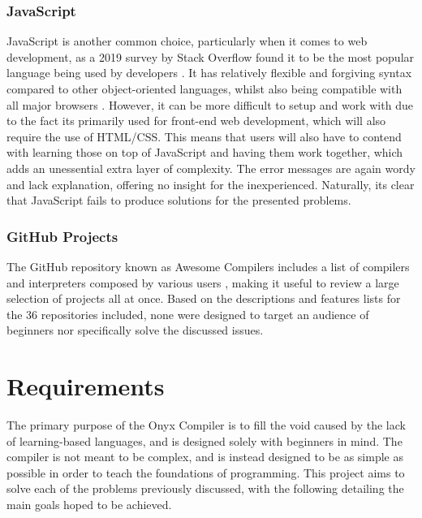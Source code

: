 \documentclass[
]{report}
\begin{document}
\subsection{JavaScript}
JavaScript is another common choice, particularly when it comes to web
development, as a 2019 survey by Stack Overflow found it to be the most
popular language being used by developers \cite{survey-stackoverflow}. It has relatively
flexible and forgiving syntax compared to other object-oriented
languages, whilst also being compatible with all major browsers
\cite{fullstack-article}. However, it can be more difficult to setup and work with due
to the fact its primarily used for front-end web development, which will
also require the use of HTML/CSS. This means that users will also have
to contend with learning those on top of JavaScript and having them work
together, which adds an unessential extra layer of complexity. The error
messages are again wordy and lack explanation, offering no insight for
the inexperienced. Naturally, its clear that JavaScript fails to produce
solutions for the presented problems.

\subsection{GitHub Projects}
The GitHub repository known as Awesome Compilers includes a list of 
compilers and \glspl{interpreter} composed by various users \cite{compilers-github}, 
making it useful to review a large selection of projects all at once. 
Based on the descriptions and features lists for the 36 repositories 
included, none were designed to target an audience of beginners nor 
specifically solve the discussed issues.

\chapter{Requirements}
The primary purpose of the Onyx Compiler is to fill the void caused by
the lack of learning-based languages, and is designed solely with
beginners in mind. The compiler is not meant to be complex, and is
instead designed to be as simple as possible in order to teach the
foundations of programming. This project aims to solve each of the
problems previously discussed, with the following detailing the main
goals hoped to be achieved.
\end{document}
